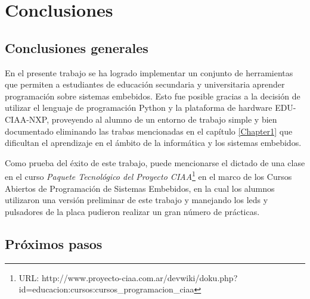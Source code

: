 
\chapter{Conclusiones} %

\label{Chapter5} %




\section{Conclusiones generales }

En el presente trabajo se ha logrado implementar un conjunto de herramientas que permiten a estudiantes  de educación secundaria y universitaria aprender programación sobre sistemas embebidos. Esto fue posible gracias a la decisión de utilizar el lenguaje de programación Python y la plataforma de hardware EDU-CIAA-NXP, proveyendo al alumno de un entorno de trabajo simple y bien documentado eliminando las trabas mencionadas en el capítulo \ref{Chapter1} que dificultan el aprendizaje en el ámbito de la informática y los sistemas embebidos.

Como prueba del éxito de este trabajo, puede mencionarse el dictado de una clase en el curso \textit{Paquete Tecnológico del Proyecto CIAA}\footnote{URL: http://www.proyecto-ciaa.com.ar/devwiki/doku.php?id=educacion:cursos:cursos\_programacion\_ciaa} en el marco de los Cursos Abiertos de Programación de Sistemas Embebidos, en la cual los alumnos utilizaron una versión preliminar de este trabajo y manejando los leds y pulsadores de la placa pudieron realizar un gran número de prácticas.


\section{Próximos pasos}

